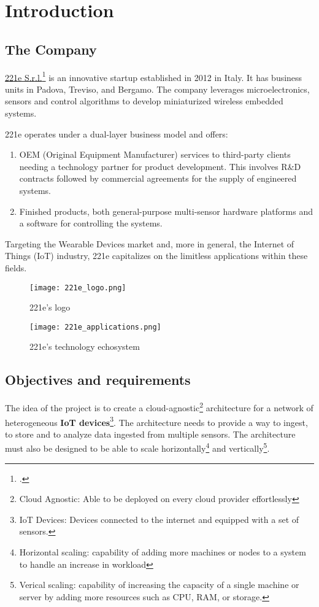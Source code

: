 \chapter{Introduction}
\label{cap:introduction}

\section{The Company}
\href{https://www.221e.com/about-us}{221e S.r.l.}\footcite{site:221e} is an innovative startup established in 2012 in Italy. It has business units in Padova, Treviso, and Bergamo. The company leverages microelectronics, sensors and control algorithms to develop miniaturized wireless embedded systems.

221e operates under a dual-layer business model and offers:
\begin{enumerate}
    \item OEM (Original Equipment Manufacturer) services to third-party clients needing a technology partner for product development. This involves R\&D contracts followed by commercial agreements for the supply of engineered systems.
    \item Finished products, both general-purpose multi-sensor hardware platforms and a software for controlling the systems. 
\end{enumerate}

Targeting the Wearable Devices market and, more in general, the Internet of Things (IoT) industry, 221e capitalizes on the limitless applications within these fields. 

\begin{figure}[htbp]
    \centering
    \texttt{[image: 221e\_logo.png]}
    \caption{221e's logo}
\end{figure}

\begin{figure}[htbp]
    \centering
    \texttt{[image: 221e\_applications.png]}
    \caption{221e's technology echosystem}
\end{figure}


\newpage
\section{Objectives and requirements}
\label{sec:objectives-and-requirements}

The idea of the project is to create a cloud-agnostic\footnote{Cloud Agnostic: Able to be deployed on every cloud provider effortlessly} architecture for a network of heterogeneous \textbf{IoT devices}\footnote{IoT Devices: Devices connected to the internet and equipped with a set of sensors.}. The architecture needs to provide a way to ingest, to store and to analyze data ingested from multiple sensors. The architecture must also be designed to be able to scale horizontally\footnote{Horizontal scaling: capability of adding more machines or nodes to a system to handle an increase in workload} and vertically\footnote{Verical scaling: capability of increasing the capacity of a single machine or server by adding more resources such as CPU, RAM, or storage.}.

